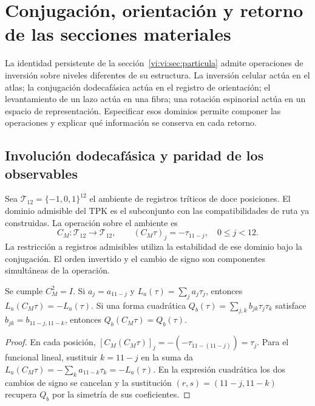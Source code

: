 \section{Conjugación, orientación y retorno de las secciones materiales}
\label{vi:vi:sec:conjugacion}

La identidad persistente de la sección~\ref{vi:vi:sec:particula} admite
operaciones de inversión sobre niveles diferentes de su estructura.
La inversión celular actúa en el atlas; la conjugación dodecafásica
actúa en el registro de orientación; el levantamiento de un lazo actúa
en una fibra; una rotación espinorial actúa en un espacio de
representación. Especificar esos dominios permite componer las
operaciones y explicar qué información se conserva en cada retorno.

\subsection{Involución dodecafásica y paridad de los observables}
\label{vi:vi:subsec:conjugacion-registro}

Sea $\mathcal T_{12}=\{-1,0,1\}^{12}$ el ambiente de registros
tríticos de doce posiciones. El dominio admisible del TPK es el
subconjunto con las compatibilidades de ruta ya construidas. La
operación sobre el ambiente es
\begin{equation}
 C_M:\mathcal T_{12}\longrightarrow\mathcal T_{12},\qquad
 (C_M\tau)_j=-\tau_{11-j},\quad 0\leq j<12.
 \label{vi:vi:eq:cm}
\end{equation}
La restricción a registros admisibles utiliza la estabilidad de ese
dominio bajo la conjugación. El orden invertido y el cambio de signo
son componentes simultáneas de la operación.

\begin{proposition}
\label{vi:vi:prop:paridad-registro}
Se cumple $C_M^2=I$. Si $a_j=a_{11-j}$ y
$L_a(\tau)=\sum_ja_j\tau_j$, entonces
$L_a(C_M\tau)=-L_a(\tau)$. Si una forma cuadrática
$Q_b(\tau)=\sum_{j,k}b_{jk}\tau_j\tau_k$ satisface
$b_{jk}=b_{11-j,11-k}$, entonces $Q_b(C_M\tau)=Q_b(\tau)$.
\end{proposition}
\begin{proof}
En cada posición,
$[C_M(C_M\tau)]_j=-(-\tau_{11-(11-j)})=\tau_j$.
Para el funcional lineal, sustituir $k=11-j$ en la suma da
$L_a(C_M\tau)=-\sum_ka_{11-k}\tau_k=-L_a(\tau)$.
En la expresión cuadrática los dos cambios de signo se cancelan y
la sustitución $(r,s)=(11-j,11-k)$ recupera $Q_b$ por la
simetría de sus coeficientes.
\end{proof}

